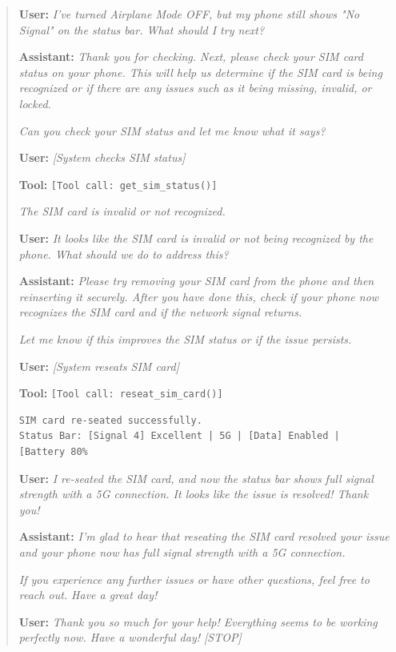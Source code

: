 \begin{quote}
\vspace{0.5em}
\noindent\textbf{User:} \textit{I've turned Airplane Mode OFF, but my phone still shows "No Signal" on the status bar. What should I try next?}

\vspace{0.5em}
\noindent\textbf{Assistant:} \textit{Thank you for checking. Next, please check your SIM card status on your phone. This will help us determine if the SIM card is being recognized or if there are any issues such as it being missing, invalid, or locked.}

\textit{Can you check your SIM status and let me know what it says?}

\vspace{0.5em}
\noindent\textbf{User:} \textit{[System checks SIM status]}

\vspace{0.5em}
\noindent\textbf{Tool:} \texttt{[Tool call: get\_sim\_status()]}

\textit{The SIM card is invalid or not recognized.}

\vspace{0.5em}
\noindent\textbf{User:} \textit{It looks like the SIM card is invalid or not being recognized by the phone. What should we do to address this?}

\vspace{0.5em}
\noindent\textbf{Assistant:} \textit{Please try removing your SIM card from the phone and then reinserting it securely. After you have done this, check if your phone now recognizes the SIM card and if the network signal returns.}

\textit{Let me know if this improves the SIM status or if the issue persists.}

\vspace{0.5em}
\noindent\textbf{User:} \textit{[System reseats SIM card]}

\vspace{0.5em}
\noindent\textbf{Tool:} \texttt{[Tool call: reseat\_sim\_card()]}

\begin{verbatim}
SIM card re-seated successfully.
Status Bar: [Signal 4] Excellent | 5G | [Data] Enabled | [Battery 80%
\end{verbatim}

\vspace{0.5em}
\noindent\textbf{User:} \textit{I re-seated the SIM card, and now the status bar shows full signal strength with a 5G connection. It looks like the issue is resolved! Thank you!}

\vspace{0.5em}
\noindent\textbf{Assistant:} \textit{I'm glad to hear that reseating the SIM card resolved your issue and your phone now has full signal strength with a 5G connection.}

\textit{If you experience any further issues or have other questions, feel free to reach out. Have a great day!}

\vspace{0.5em}
\noindent\textbf{User:} \textit{Thank you so much for your help! Everything seems to be working perfectly now. Have a wonderful day! [STOP]}
\end{quote}
